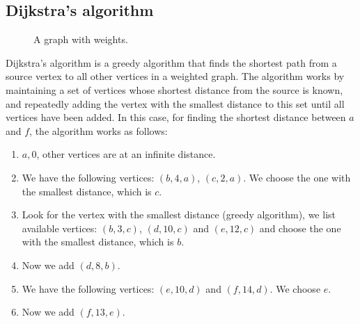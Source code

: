 \documentclass[11pt]{article}
\begin{document}
\subsection{Dijkstra's algorithm}
\begin{figure}[H]
    \centering
    \caption{A graph with weights.}
    \label{fig:weighted_graph}
\end{figure}

Dijkstra's algorithm is a greedy algorithm that finds the shortest path from a source vertex to all other vertices in a weighted graph. The algorithm works by maintaining a set of vertices whose shortest distance from the source is known, and repeatedly adding the vertex with the smallest distance to this set until all vertices have been added.
In this case, for finding the shortest distance between $a$ and $f$, the algorithm works as follows:
\begin{enumerate}
    \item $a, 0$, other vertices are at an infinite distance.
    \item We have the following vertices: $(b, 4, a)$, $(c, 2, a)$. We choose the one with the smallest distance, which is $c$.
    \item Look for the vertex with the smallest distance (greedy algorithm), we list available vertices: $(b,3, c)$, $(d, 10, c)$ and $(e, 12, c)$ and choose the one with the smallest distance, which is $b$.
    \item Now we add $(d,8,b)$.
    \item We have the following vertices: $(e, 10, d)$ and $(f, 14, d)$. We choose $e$.
    \item Now we add $(f, 13, e)$.
\end{enumerate}
\end{document}
